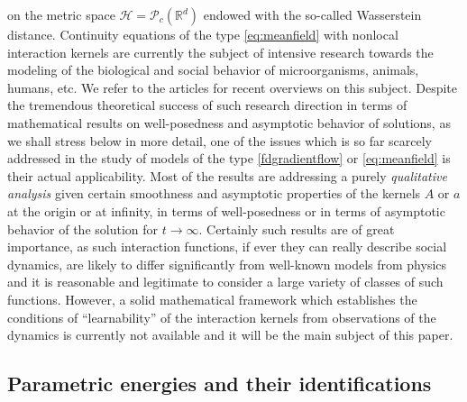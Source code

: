 on the metric space $\mathcal H =\mathcal P_c(\mathbb R^d)$ endowed with the so-called Wasserstein distance. Continuity equations of the type \eqref{eq:meanfield} with nonlocal interaction kernels are currently the subject of intensive research  towards the modeling of the biological and social behavior of microorganisms, animals, humans, etc. We refer to the  articles \cite{13-Carrillo-Choi-Hauray-MFL,cafotove10} for recent overviews on this subject. Despite the tremendous theoretical success of such research direction in terms of mathematical results on well-posedness and asymptotic behavior of solutions, as we shall stress below in more detail, one of the issues which is so far scarcely addressed in the study of models of the type \eqref{fdgradientflow} or \eqref{eq:meanfield} is their actual applicability. Most of the results are addressing a purely {\it qualitative analysis} given certain smoothness and asymptotic properties of the kernels $A$ or $a$ at the origin or at infinity, in terms of well-posedness or in terms of asymptotic behavior of the solution for $t \to \infty$.  Certainly such results are of great importance, as such interaction functions, if ever they can really describe social dynamics,  are likely to differ significantly from well-known models from physics and it is reasonable and legitimate to consider a large variety of classes of such functions.
However, a solid mathematical framework which establishes the conditions of ``learnability'' of the interaction kernels from observations of the dynamics is currently not available and it will be the main subject of this paper.

\subsection{Parametric energies and their identifications}

